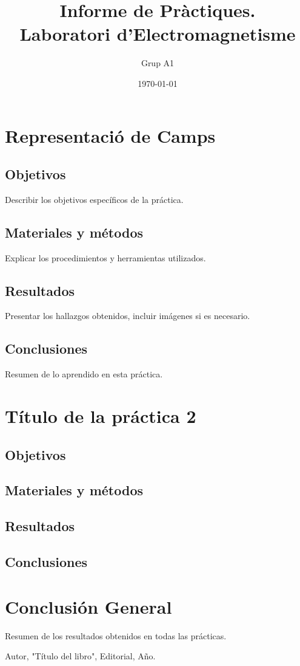 \documentclass[a4paper,11pt]{report}
\title{\textbf{\huge{Informe de Pràctiques. \\ \vspace{0.2cm} Laboratori d'Electromagnetisme}}}
\author{Grup A1}
\date{\today}
\begin{document}
	
	\maketitle
	
	\tableofcontents
	\newpage
	
	\chapter{Representació de Camps}
	\section{Objetivos}
	Describir los objetivos específicos de la práctica.
	
	\section{Materiales y métodos}
	Explicar los procedimientos y herramientas utilizados.
	
	\section{Resultados}
	Presentar los hallazgos obtenidos, incluir imágenes si es necesario.
	
	\section{Conclusiones}
	Resumen de lo aprendido en esta práctica.
	
	\chapter{Título de la práctica 2}
	\section{Objetivos}
	\section{Materiales y métodos}
	\section{Resultados}
	\section{Conclusiones}
	
	\chapter{Conclusión General}
	Resumen de los resultados obtenidos en todas las prácticas.
	
	\begin{thebibliography}{9}
		 Autor, "Título del libro", Editorial, Año.
	\end{thebibliography}
	
\end{document}
